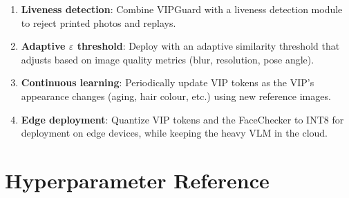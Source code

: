 \documentclass[12pt,a4paper]{article}
\begin{document}
\begin{enumerate}
    \item \textbf{Liveness detection}: Combine VIPGuard with a liveness detection module to reject printed photos and replays.

    \item \textbf{Adaptive $\varepsilon$ threshold}: Deploy with an adaptive similarity threshold that adjusts based on image quality metrics (blur, resolution, pose angle).

    \item \textbf{Continuous learning}: Periodically update VIP tokens as the VIP's appearance changes (aging, hair colour, etc.) using new reference images.

    \item \textbf{Edge deployment}: Quantize VIP tokens and the FaceChecker to INT8 for deployment on edge devices, while keeping the heavy VLM in the cloud.
\end{enumerate}

\appendix
\section{Hyperparameter Reference}
\end{document}
